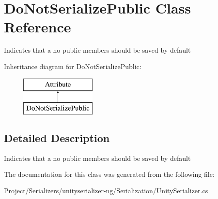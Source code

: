 \hypertarget{class_do_not_serialize_public}{}\section{Do\+Not\+Serialize\+Public Class Reference}
\label{class_do_not_serialize_public}


Indicates that a no public members should be saved by default  


Inheritance diagram for Do\+Not\+Serialize\+Public\+:\begin{figure}[H]
\begin{center}
\leavevmode
\includegraphics[height=2.000000cm]{class_do_not_serialize_public}
\end{center}
\end{figure}


\subsection{Detailed Description}
Indicates that a no public members should be saved by default 



The documentation for this class was generated from the following file\+:\begin{DoxyCompactItemize}
\item 
Project/\+Serializers/unityserializer-\/ng/\+Serialization/Unity\+Serializer.\+cs\end{DoxyCompactItemize}
